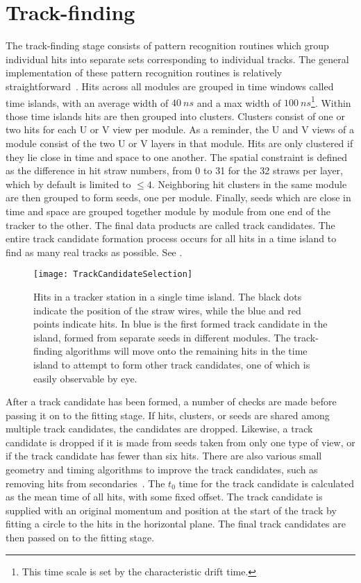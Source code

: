 \section{Track-finding}
\label{sec:TrackFinding}

The track-finding stage consists of pattern recognition routines which group individual hits into separate sets corresponding to individual tracks. The general implementation of these pattern recognition routines is relatively straightforward~\cite{trackfinding,trackfinding2}. Hits across all modules are grouped in time windows called time islands, with an average width of $\SI{40}{ns}$ and a max width of $\SI{100}{ns}$\footnote{This time scale is set by the characteristic drift time.}. Within those time islands hits are then grouped into clusters. Clusters consist of one or two hits for each U or V view per module. As a reminder, the U and V views of a module consist of the two U or V layers in that module. Hits are only clustered if they lie close in time and space to one another. The spatial constraint is defined as the difference in hit straw numbers, from 0 to 31 for the 32 straws per layer, which by default is limited to $\leq 4$. Neighboring hit clusters in the same module are then grouped to form seeds, one per module. Finally, seeds which are close in time and space are grouped together module by module from one end of the tracker to the other. The final data products are called track candidates. The entire track candidate formation process occurs for all hits in a time island to find as many real tracks as possible. See .

\begin{figure}
    \centering
    \texttt{[image: TrackCandidateSelection]}
    \caption[Track candidate selection]{Hits in a tracker station in a single time island. The black dots indicate the position of the straw wires, while the blue and red points indicate hits. In blue is the first formed track candidate in the island, formed from separate seeds in different modules. The track-finding algorithms will move onto the remaining hits in the time island to attempt to form other track candidates, one of which is easily observable by eye.}    
    \label{fig:TrackCandidateSelection}
\end{figure}

After a track candidate has been formed, a number of checks are made before passing it on to the fitting stage. If hits, clusters, or seeds are shared among multiple track candidates, the candidates are dropped. Likewise, a track candidate is dropped if it is made from seeds taken from only one type of view, or if the track candidate has fewer than six hits. There are also various small geometry and timing algorithms to improve the track candidates, such as removing hits from secondaries~\cite{trackfinding3}. The $t_{0}$ time for the track candidate is calculated as the mean time of all hits, with some fixed offset. The track candidate is supplied with an original momentum and position at the start of the track by fitting a circle to the hits in the horizontal plane. The final track candidates are then passed on to the fitting stage. 

